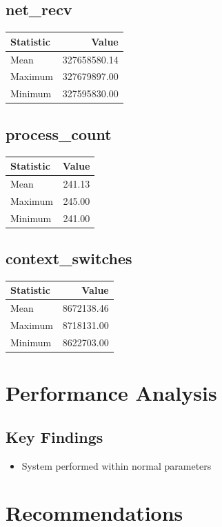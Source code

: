 \documentclass[11pt]{article}
\begin{document}
\subsection{net_recv}
\begin{tabular}{lr}
\toprule
Statistic & Value \\
\midrule
Mean & 327658580.14 \\
Maximum & 327679897.00 \\
Minimum & 327595830.00 \\
\bottomrule
\end{tabular}


\subsection{process_count}
\begin{tabular}{lr}
\toprule
Statistic & Value \\
\midrule
Mean & 241.13 \\
Maximum & 245.00 \\
Minimum & 241.00 \\
\bottomrule
\end{tabular}


\subsection{context_switches}
\begin{tabular}{lr}
\toprule
Statistic & Value \\
\midrule
Mean & 8672138.46 \\
Maximum & 8718131.00 \\
Minimum & 8622703.00 \\
\bottomrule
\end{tabular}


\section{Performance Analysis}
\subsection{Key Findings}
\begin{itemize}
\item System performed within normal parameters
\end{itemize}

\section{Recommendations}
\begin{itemize}

\end{itemize}
\end{document}
